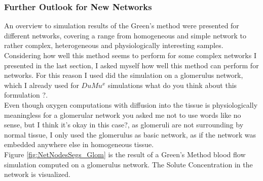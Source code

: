 \newpage
\subsubsection*{Further Outlook for New Networks}

An overview to simulation results of the Green's method were presented for different networks, covering a range from homogeneous and simple network to rather complex, heterogeneous and physiologically interesting samples. %
\\Considering how well this method seems to perform for some complex networks I presented in the last section, I asked myself how well this method can perform for networks. For this reason I used did the simulation on a glomerulus network, which I already used for $DuMu^x$ simulations {\color{red} what do you think about this formulation ?}.
\\Even though oxygen computations with diffusion into the tissue is physiologically meaningless for a glomerular network {\color{red} you asked me not to use words like no sense, but I think it's okay in this case?}, as glomeruli are not surrounding by normal tissue, I only used the glomerulus as basic network, as if the network was embedded anywhere else in homogeneous tissue.
\\Figure \ref{fig:NetNodesSegs_Glom}  is the result of a Green's Method blood flow simulation computed on a glomerulus network. The Solute Concentration in the network is visualized.\\
